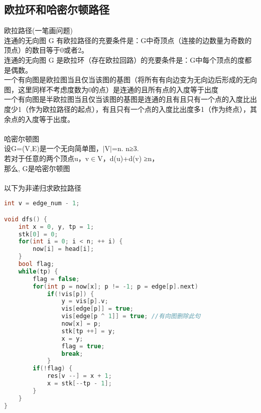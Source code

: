 \subsection{欧拉环和哈密尔顿路径}
    欧拉路径(一笔画问题)\\
    连通的无向图 G 有欧拉路径的充要条件是：G中奇顶点（连接的边数量为奇数的顶点）的数目等于0或者2。\\
    连通的无向图 G 是欧拉环（存在欧拉回路）的充要条件是：G中每个顶点的度都是偶数。\\
    一个有向图是欧拉图当且仅当该图的基图（将所有有向边变为无向边后形成的无向图，这里同样不考虑度数为0的点）是连通的且所有点的入度等于出度\\
    一个有向图是半欧拉图当且仅当该图的基图是连通的且有且只有一个点的入度比出度少1（作为欧拉路径的起点），有且只有一个点的入度比出度多1（作为终点），其余点的入度等于出度。\\
    \\
    哈密尔顿图 \\
    设G=(V,E)是一个无向简单图，$\mid$V$\mid$=n.  n≥3. \\
    若对于任意的两个顶点u，v$\in$V，d(u)+d(v) ≥n，\\
    那么, G是哈密尔顿图\\
    \\
    以下为非递归求欧拉路径\\
    \begin{lstlisting}[language=c++]
int v = edge_num - 1;

void dfs() {
    int x = 0, y, tp = 1;
    stk[0] = 0;
    for(int i = 0; i < n; ++ i) {
        now[i] = head[i];
    }
    bool flag;
    while(tp) {
        flag = false;
        for(int p = now[x]; p != -1; p = edge[p].next)
            if(!vis[p]) {
                y = vis[p].v;
                vis[edge[p]] = true;
                vis[edge[p ^ 1]] = true; //有向图删除此句
                now[x] = p;
                stk[tp ++] = y;
                x = y;
                flag = true;
                break;
            }
        if(!flag) {
            res[v --] = x + 1;
            x = stk[--tp - 1];
        }
    }
}
    \end{lstlisting}

